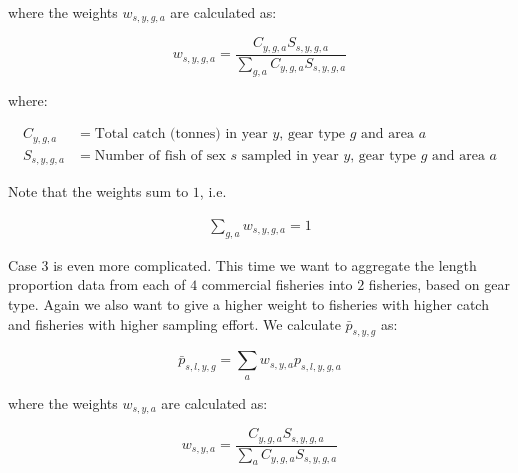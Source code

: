 \documentclass[12pt,a4paper]{article}
\begin{document}
where the weights $w_{s,y,g,a}$ are calculated as:

\begin{equation}
w_{s,y,g,a} = \frac{ C_{y,g,a} S_{s,y,g,a} }{\sum_{g,a} C_{y,g,a} S_{s,y,g,a} }
\end{equation}

where:

\begin{align}
C_{y,g,a} &= \text{Total catch (tonnes) in year $y$, gear type $g$ and area $a$} \\
S_{s,y,g,a} &= \text{Number of fish of sex $s$ sampled in year $y$, gear type $g$ and area $a$}
\end{align}

Note that the weights sum to $1$, i.e.

\begin{align}
\sum_{g,a} w_{s,y,g,a} = 1
\end{align}

Case 3 is even more complicated. This time we want to aggregate the length proportion data from each of $4$ commercial fisheries into $2$ fisheries, based on gear type. Again we also want to give a higher weight to fisheries with higher catch and fisheries with higher sampling effort. We calculate $\bar{p}_{s,y,g}$ as:

\begin{equation}
\bar{p}_{s,l,y,g} = \sum_{a} w_{s,y,a} p_{s,l,y,g,a}
\end{equation}

where the weights $w_{s,y,a}$ are calculated as:

\begin{equation}
w_{s,y,a} = \frac{ C_{y,g,a} S_{s,y,g,a} }{\sum_{a} C_{y,g,a} S_{s,y,g,a} }
\end{equation}
\end{document}
